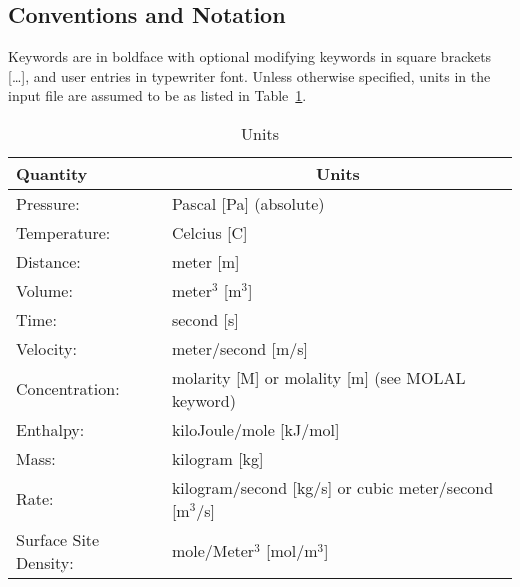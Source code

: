 \subsection{\bf Conventions and Notation} 

Keywords are in boldface with optional modifying keywords in square brackets [\ldots], and user entries in typewriter font.
Unless otherwise specified, units in the input file are assumed to be as listed in Table~\ref{tunits}.

\begin{table}[h]\centering
\caption{Units}\label{tunits}

\vspace{3mm}

\begin{tabular}{ll}
\toprule[2pt]
Quantity & \multicolumn{1}{c}{Units}\\
\midrule[1pt]
Pressure: & Pascal [Pa] (absolute)\\
Temperature: & Celcius [C]\\
Distance: & meter [m]\\
Volume: & meter$^3$ [m$^3$]\\
Time: & second [s]\\
Velocity: & meter/second [m/s]\\
Concentration: & molarity [M] or molality [m] (see MOLAL keyword)\\
Enthalpy: & kiloJoule/mole [kJ/mol]\\
Mass: & kilogram [kg]\\
Rate: & kilogram/second [kg/s] or cubic meter/second [m$^3$/s]\\
Surface Site Density: & mole/Meter$^{3}$ [mol/m$^{3}$]\\
\bottomrule[1.5pt]
\end{tabular}
\end{table}

\begin{comment}
\begin{verbatim}
\protect\hypertarget{target_XXX}{}
\subsection{Keyword: XXX}
{\noindent\bf Description:}
{\noindent\bf Input:}
\begin{deflist}{0000000000}
\item[]
\end{deflist}
{\noindent\bf Explanation:}
\begin{description}
\item[Keyword XXX]
\end{description}
{\noindent\bf Examples:}
\end{verbatim}
\end{comment}

